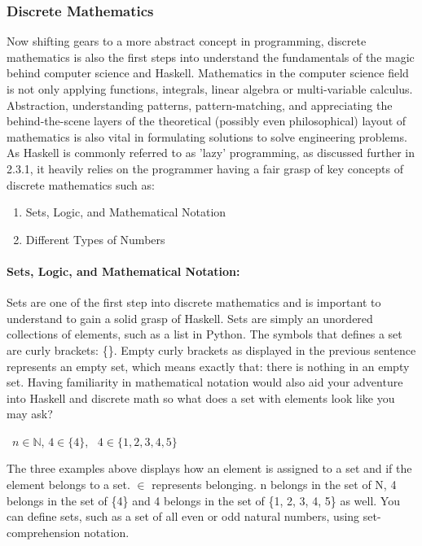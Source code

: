 \documentclass{article}
\begin{document}
\subsubsection{Discrete Mathematics}

Now shifting gears to a more abstract concept in programming, discrete mathematics is also the first steps into understand the fundamentals of the magic behind computer science and Haskell. Mathematics in the computer science field is not only applying functions, integrals, linear algebra or multi-variable calculus. Abstraction, understanding patterns, pattern-matching, and appreciating the behind-the-scene layers of the theoretical (possibly even philosophical) layout of mathematics is also vital in formulating solutions to solve engineering problems. As Haskell is commonly referred to as 'lazy' programming, as discussed further in 2.3.1, it heavily relies on the programmer having a fair grasp of key concepts of discrete mathematics such as:

\begin{enumerate}
    \item Sets, Logic, and Mathematical Notation
    \item Different Types of Numbers
\end{enumerate}

\paragraph{Sets, Logic, and Mathematical Notation:}
Sets are one of the first step into discrete mathematics and is important to understand to gain a solid grasp of Haskell. Sets are simply an unordered collections of elements, such as a list in Python. The symbols that defines a set are curly brackets: \{\}. Empty curly brackets as displayed in the previous sentence represents an empty set, which means exactly that: there is nothing in an empty set. Having familiarity in mathematical notation would also aid your adventure into Haskell and discrete math so what does a set with elements look like you may ask?

\begin{center}
\ $n\in \mathbb N$, $4\in \{4\}$, \ $4\in \{1, 2, 3, 4, 5\}$
\end{center}

\noindent
The three examples above displays how an element is assigned to a set and if the element belongs to a set. $\in$ represents belonging. n belongs in the set of N, 4 belongs in the set of \{4\} and 4 belongs in the set of \{1, 2, 3, 4, 5\} as well. You can define sets, such as a set of all even or odd natural numbers, using set-comprehension notation.
\end{document}
